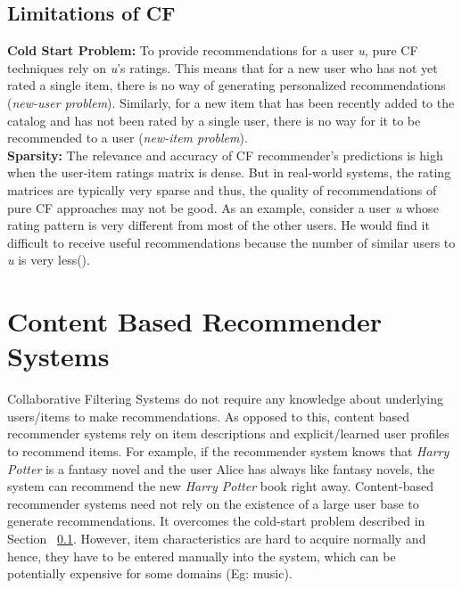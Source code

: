 \subsection{Limitations of CF}
\label{sec:limCF}
\textbf{Cold Start Problem:} To provide recommendations for a user \textit{u}, pure CF techniques rely on \textit{u}'s ratings. This means that for a new user who has not yet rated a single item, there is no way of generating personalized recommendations (\textit{new-user problem}). 
Similarly, for a new item that has been recently added to the catalog and has not been rated by a single user, there is no way for it to be recommended to a user (\textit{new-item problem}).\\
\textbf{Sparsity:} The relevance and accuracy of CF recommender's predictions is high when the user-item ratings matrix is dense.
But in real-world systems, the rating matrices are typically very sparse and thus, the quality of recommendations of pure CF approaches may not be good.
As an example, consider a user \textit{u} whose rating pattern is very different from most of the other users. 
He would find it difficult to receive useful recommendations because the number of similar users to \textit{u} is very less(\cite{balab1997}).




%

%

\section{Content Based Recommender Systems}
\label{sec:content}
Collaborative Filtering Systems do not require any knowledge about underlying users/items to make recommendations.
As opposed to this, content based recommender systems rely on item descriptions and explicit/learned user profiles to recommend items.
For example, if the recommender system knows that \textit{Harry Potter} is a fantasy novel and the user Alice has always like fantasy novels, the system can recommend the new \textit{Harry Potter} book right away. 
Content-based recommender systems need not rely on the existence of a large user base to generate recommendations.
It overcomes the cold-start problem described in Section ~\ref{sec:limCF}. However, item characteristics are hard to acquire normally and hence, they have to be entered manually into the system, which can be potentially expensive for some domains (Eg: music).


